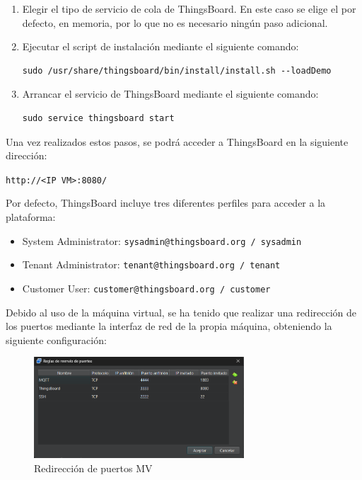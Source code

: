 \begin{enumerate}
    \item Elegir el tipo de servicio de cola de ThingsBoard. En este caso se elige el por defecto, en memoria, por lo que no es necesario ningún paso adicional.

    \item Ejecutar el script de instalación mediante el siguiente comando:
    \begin{verbatim}
sudo /usr/share/thingsboard/bin/install/install.sh --loadDemo
    \end{verbatim}

    \item Arrancar el servicio de ThingsBoard mediante el siguiente comando:
    \begin{verbatim}
sudo service thingsboard start
    \end{verbatim}
\end{enumerate}

Una vez realizados estos pasos, se podrá acceder a ThingsBoard en la siguiente dirección: 

\texttt{http://<IP VM>:8080/}

Por defecto, ThingsBoard incluye tres diferentes perfiles para acceder a la plataforma:
\begin{itemize}
    \item System Administrator: \texttt{sysadmin@thingsboard.org / sysadmin}
    \item Tenant Administrator: \texttt{tenant@thingsboard.org / tenant}
    \item Customer User: \texttt{customer@thingsboard.org / customer}
\end{itemize}

Debido al uso de la máquina virtual, se ha tenido que realizar una redirección de los puertos mediante la interfaz de red de la propia máquina, obteniendo la siguiente configuración:

\begin{figure}[H]
    \centering
    \includegraphics[width=0.7\textwidth]{images/3-software/3-2-2-thingsboard/PuertosMV.png}
    \caption{Redirección de puertos MV}
    \label{fig:3-2-2-PuertosMV}
\end{figure}

